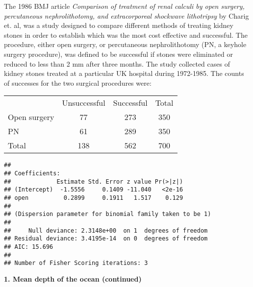\documentclass[10pt,handout]{beamer}\usepackage[]{graphicx}\usepackage[]{color}
\makeatletter
\newenvironment{kframe}{%
 \def\at@end@of@kframe{}%
 \ifinner\ifhmode%
  \def\at@end@of@kframe{\end{minipage}}%
  \begin{minipage}{\columnwidth}%
 \fi\fi%
 \def\FrameCommand##1{\hskip\@totalleftmargin \hskip-\fboxsep
 \colorbox{shadecolor}{##1}\hskip-\fboxsep
     \hskip-\linewidth \hskip-\@totalleftmargin \hskip\columnwidth}%
 \MakeFramed {\advance\hsize-\width
   \@totalleftmargin\z@ \linewidth\hsize
   \@setminipage}}%
 {\par\unskip\endMakeFramed%
 \at@end@of@kframe}
\newenvironment{knitrout}{}{} %
\makeatother
\begin{document}
\begin{frame}
\vspace{-.91in}
	\tiny
The 1986 BMJ article \textit{Comparison of treatment of renal calculi by open surgery, percutaneous nephrolithotomy, and extracorporeal shockwave lithotripsy} by Charig et. al, was a study designed to compare different methods of treating kidney stones in order to establish which was the most cost effective and successful. The procedure, either open surgery, or percutaneous nephrolithotomy (PN, a keyhole surgery procedure), was defined to be successful if stones were eliminated or reduced to less than 2 mm after three months. The study collected cases of kidney stones treated at a particular UK hospital during 1972-1985. The counts of successes for the two surgical procedures were:
\vspace{-.11in}
\begin{table}[h]
	\centering
	\begin{tabular}{lcc|c}
		& Unsuccessful &  Successful & Total\\
		Open surgery & 77 & 273 & 350 \\
		PN & 61 & 289 & 350 \\
		\hline
		Total & 138 & 562 & 700
	\end{tabular}
\end{table}
\vspace{-.21in}
\begin{knitrout}\tiny
{}\color{fgcolor}\begin{kframe}
\begin{verbatim}
## 
## Coefficients:
##             Estimate Std. Error z value Pr(>|z|)
## (Intercept)  -1.5556     0.1409 -11.040   <2e-16
## open          0.2899     0.1911   1.517    0.129
## 
## (Dispersion parameter for binomial family taken to be 1)
## 
##     Null deviance: 2.3148e+00  on 1  degrees of freedom
## Residual deviance: 3.4195e-14  on 0  degrees of freedom
## AIC: 15.696
## 
## Number of Fisher Scoring iterations: 3
\end{verbatim}
\end{kframe}
\end{knitrout}

\end{frame}

\begin{frame}
	\vspace*{-5.0in}
	\textbf{1. Mean depth of the ocean (continued)}
	
\end{frame}
\end{document}
